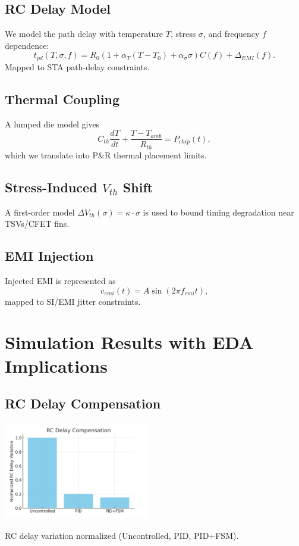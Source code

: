 \documentclass[conference]{IEEEtran}
\begin{document}
\subsection{RC Delay Model}
We model the path delay with temperature $T$, stress $\sigma$, and frequency $f$ dependence:
\begin{equation}
t_{pd}(T,\sigma,f) = R_0(1+\alpha_T(T-T_0)+\alpha_\sigma\sigma)C(f)+\Delta_{EMI}(f).
\end{equation}
Mapped to STA path-delay constraints.

\subsection{Thermal Coupling}
A lumped die model gives
\begin{equation}
C_{th}\frac{dT}{dt} + \frac{T-T_{amb}}{R_{th}} = P_{chip}(t),
\end{equation}
which we translate into P\&R thermal placement limits.

\subsection{Stress-Induced $V_{th}$ Shift}
A first-order model $\Delta V_{th}(\sigma) = \kappa \cdot \sigma$ is used to bound timing degradation near TSVs/CFET fins.

\subsection{EMI Injection}
Injected EMI is represented as
\begin{equation}
v_{emi}(t) = A\sin(2\pi f_{emi}t),
\end{equation}
mapped to SI/EMI jitter constraints.

\section{Simulation Results with EDA Implications}
\subsection{RC Delay Compensation}
\includegraphics[width=0.48\textwidth]{figs/sim_delay_rc.png}
\caption{RC delay variation normalized (Uncontrolled, PID, PID+FSM).}
\end{document}
